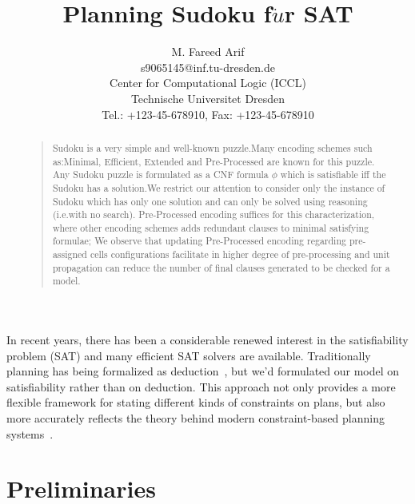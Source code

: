 \documentclass[letterpaper]{article}
\begin{document}
%

\title{Planning Sudoku f$\ddot{u}$r SAT}
\author{M. Fareed Arif\\
              s9065145@inf.tu-dresden.de\\
Center for Computational Logic (ICCL)\\
 Technische Universitet Dresden \\
              Tel.: +123-45-678910, Fax: +123-45-678910
}

\maketitle

\begin{abstract}
\begin{quote}
	Sudoku is a very simple and well-known puzzle.Many encoding schemes such as:Minimal, Efficient, Extended and Pre-Processed are known for this puzzle. Any Sudoku puzzle is formulated as a CNF formula $\phi$ which is satisfiable iff the Sudoku has a solution.We restrict our attention to consider only the instance of Sudoku which has only one solution and can only be solved using reasoning (i.e.with no search). Pre-Processed encoding suffices for this characterization, where other encoding schemes adds redundant clauses to minimal satisfying formulae; We observe that updating Pre-Processed encoding regarding pre-assigned cells configurations facilitate in higher degree of pre-processing and unit propagation can reduce the number of final clauses generated to be checked for a model.
\end{quote}
\end{abstract}

\noindent In recent years, there has been a considerable renewed interest in the satisfiability problem (SAT) and many efficient SAT solvers are available. Traditionally planning has being formalized as deduction~\cite{McCarthy1969}, but we'd formulated our model on satisfiability rather than on deduction. This approach not only provides a more flexible framework for stating different kinds of constraints on plans, but also more accurately reflects the theory behind modern constraint-based planning systems~\cite{Henry2006}.


\section{Preliminaries}
\end{document}
